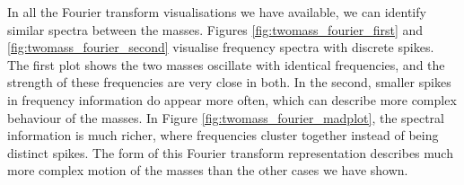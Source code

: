 In all the Fourier transform visualisations we have available,
we can identify similar spectra between the masses.
Figures \ref{fig:twomass_fourier_first} and \ref{fig:twomass_fourier_second} visualise frequency spectra with discrete spikes.
The first plot shows the two masses oscillate with identical frequencies,
and the strength of these frequencies are very close in both.
In the second, smaller spikes in frequency information do appear more often,
which can describe more complex behaviour of the masses.
In Figure \ref{fig:twomass_fourier_madplot},
the spectral information is much richer,
where frequencies cluster together instead of being distinct spikes.
The form of this Fourier transform representation describes much more complex motion of the masses than the other cases we have shown.

%
%

%